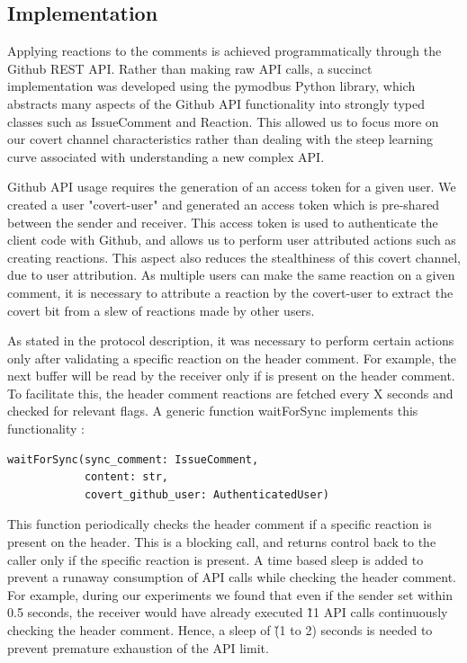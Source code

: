 \documentclass[conference]{IEEEtran}
\begin{document}
\subsection{Implementation}
Applying reactions to the comments is achieved programmatically through the Github REST API. Rather than making raw API calls, a succinct implementation was developed using the pymodbus Python library, which abstracts many aspects of the Github API functionality into strongly typed classes such as IssueComment and Reaction. This allowed us to focus more on our covert channel characteristics rather than dealing with the steep learning curve associated with understanding a new complex API. 

Github API usage requires the generation of an access token for a given user. We created a user "covert-user" and generated an access token which is pre-shared between the sender and receiver. This access token is used to authenticate the client code with Github, and allows us to perform user attributed actions such as creating reactions. This aspect also reduces the stealthiness of this covert channel, due to user attribution. As multiple users can make the same reaction on a given comment, it is necessary to attribute a reaction by the covert-user to extract the covert bit from a slew of reactions made by other users. 

As stated in the protocol description, it was necessary to perform certain actions only after validating a specific reaction on the header comment. For example, the next buffer will be read by the receiver only if  is present on the header comment. To facilitate this, the header comment reactions are fetched every X seconds and checked for relevant flags. A generic function waitForSync implements this functionality : 
\begin{verbatim}
waitForSync(sync_comment: IssueComment, 
            content: str, 
            covert_github_user: AuthenticatedUser)
\end{verbatim}
This function periodically checks the header comment if a specific reaction is present on the header. This is a blocking call, and returns control back to the caller only if the specific reaction is present. A time based sleep is added to prevent a runaway consumption of API calls while checking the header comment. For example, during our experiments we found that even if the sender set  within 0.5 seconds, the receiver would have already executed \~ 11 API calls continuously checking the header comment. Hence, a sleep of \~ (1 to 2) seconds is needed to prevent premature exhaustion of the API limit. 
\end{document}
